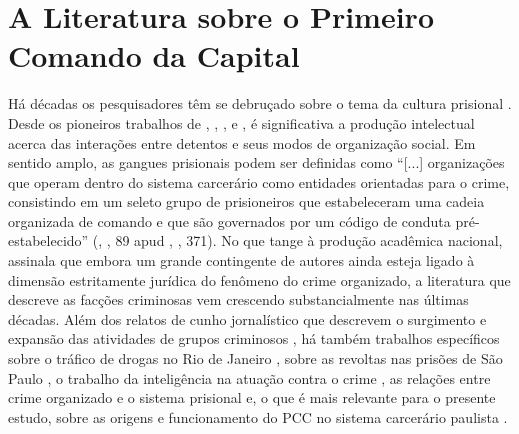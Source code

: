 \documentclass[a4paper,11pt]{article}
\begin{document}
\section{A Literatura sobre o Primeiro Comando da Capital}

Há décadas os pesquisadores têm se debruçado sobre o tema da cultura prisional \citep[398]{hunt1993changes}. Desde os pioneiros trabalhos de \cite{clemmer1940prison}, \cite{sykes1960inmate}, \cite{goffman1961characteristics}, \cite{berk1966organizational} e \cite{tittle1969inmate}, é significativa a produção intelectual acerca das interações entre detentos e seus modos de organização social. Em sentido amplo, as gangues prisionais podem ser definidas como ``[...] organizações que operam dentro do sistema carcerário como entidades orientadas para o crime, consistindo em um seleto grupo de prisioneiros que estabeleceram uma cadeia organizada de comando e que são governados por um código de conduta pré-estabelecido'' (\citeauthor{lyman1989gangland}, \citeyear{lyman1989gangland}, 89 apud \citeauthor{delisi2004gang}, \citeyear{delisi2004gang}, 371). No que tange à produção acadêmica nacional, \citet[365]{dias2011pulverizaccao} assinala que embora um grande contingente de autores ainda esteja ligado à dimensão estritamente jurídica do fenômeno do crime organizado, a literatura que descreve as facções criminosas vem crescendo substancialmente nas últimas décadas. Além dos relatos de cunho jornalístico que descrevem o surgimento e expansão das atividades de grupos criminosos \citep{amorim2003cv, barcellos2003abusado, jozino2004cobras, souza2007pcc}, há também trabalhos específicos sobre o tráfico de drogas no Rio de Janeiro \citep{lessing2008facccoes, zaluar1999debate}, sobre as revoltas nas prisões de São Paulo \citep{adorno2007organized,da2009crime, salla2006rebelioes}, o trabalho da inteligência na atuação contra o crime \citep{mingardi2007trabalho}, as relações entre crime organizado e o sistema prisional \citep{ramalho1979mundo, pieta1993pavilhao, porto2007crime} e, o que é mais relevante para o presente estudo, sobre as origens e funcionamento do PCC no sistema carcerário paulista \citep{biondi2010junto, dias2009guerra, dias2011pulverizaccao, marques2010liderancca}. 
\end{document}
